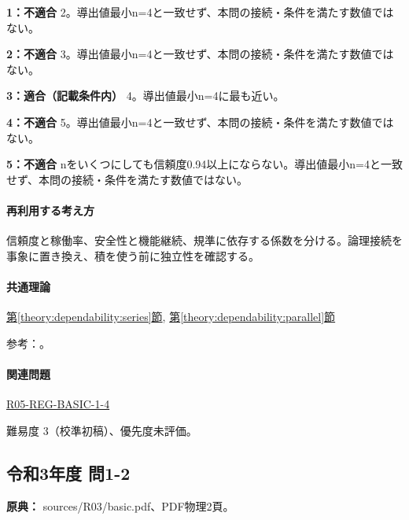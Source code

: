 \noindent\textbf{1：不適合} 2。導出値最小n=\allowbreak{}4と一致せず、本問の接続・条件を満たす数値ではない。\par

\noindent\textbf{2：不適合} 3。導出値最小n=\allowbreak{}4と一致せず、本問の接続・条件を満たす数値ではない。\par

\noindent\textbf{3：適合（記載条件内）} 4。導出値最小n=\allowbreak{}4に最も近い。\par

\noindent\textbf{4：不適合} 5。導出値最小n=\allowbreak{}4と一致せず、本問の接続・条件を満たす数値ではない。\par

\noindent\textbf{5：不適合} nをいくつにしても信頼度0.94以上にならない。導出値最小n=\allowbreak{}4と一致せず、本問の接続・条件を満たす数値ではない。\par

\paragraph{再利用する考え方} 信頼度と稼働率、安全性と機能継続、規準に依存する係数を分ける。論理接続を事象に置き換え、積を使う前に独立性を確認する。

\paragraph{共通理論} \hyperref[theory:dependability:series]{第\ref*{theory:dependability:series}節}, \hyperref[theory:dependability:parallel]{第\ref*{theory:dependability:parallel}節}

\par 参考：\cite{reliability_nist_series,reliability_nist_parallel}。

\paragraph{関連問題} \hyperref[q:r05-reg-basic-1-4]{R05-REG-BASIC-1-4}

\par 難易度 3（校準初稿）、優先度未評価。

\subsection{令和3年度 問1-2}
\label{q:r03-reg-basic-1-2}

\noindent\textbf{原典：} sources/R03/basic.pdf、PDF物理2頁。


